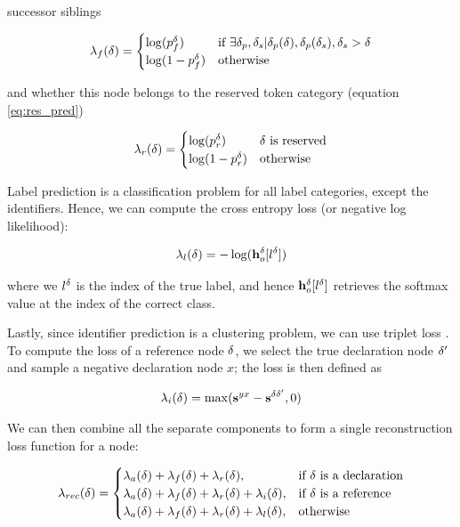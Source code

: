 successor siblings

\begin{align}
    \lambda_{f}(\delta) = \begin{cases}
        \log(p^\delta_f) & \text{if }\exists \delta_p, \delta_s | \delta_p(\delta), \delta_p(\delta_s), \delta_s > \delta \\
        \log(1- p^\delta_f) & \text{otherwise}
    \end{cases}
\end{align}

and whether this node belongs to the reserved token category (equation \ref{eq:res_pred})

\begin{align}
    \lambda_{r}(\delta) = \begin{cases}
        \log(p^\delta_r)  & \delta \text{ is reserved} \\
        \log(1- p^\delta_r)  & \text{otherwise}
    \end{cases}
\end{align}

Label prediction is a classification problem for all label categories, except the identifiers.
Hence, we can compute the cross entropy loss (or negative log likelihood):

\begin{align}
    \lambda_{l}(\delta) = - \log(\mathbf{h}_o^\delta[l^\delta])
\end{align}

\noindent where we $l^\delta$ is the index of the true label, and hence $\mathbf{h}_o^\delta[l^\delta]$ retrieves the softmax value at the index of the correct class. 

Lastly, since identifier prediction is a clustering problem, we can use triplet loss \cite{chechikLargeScaleOnline2010}. 
To compute the loss of a reference node $\delta$, we select the true declaration node $\delta'$ and sample a negative declaration node $x$; the loss is then defined as

\begin{align}
    \lambda_i(\delta)=\max(\mathbf{s}^{yx} - \mathbf{s}^{\delta \delta'},0)
\end{align}

\noindent We can then combine all the separate components to form a single reconstruction loss function for a node:

\begin{small}
\begin{align}
   \lambda_{rec}(\delta) = 
\begin{cases}
    \lambda_{a}(\delta) + \lambda_{f}(\delta) + \lambda_{r}(\delta),& \text{if } \delta \text{ is a declaration} \\
    \lambda_{a}(\delta) + \lambda_{f}(\delta) + \lambda_{r}(\delta) + \lambda_{i}(\delta),& \text{if } \delta \text{ is a reference} \\
    \lambda_{a}(\delta) + \lambda_{f}(\delta) + \lambda_{r}(\delta) + \lambda_{l}(\delta),& \text{otherwise}
\end{cases}
\end{align}
\end{small}

